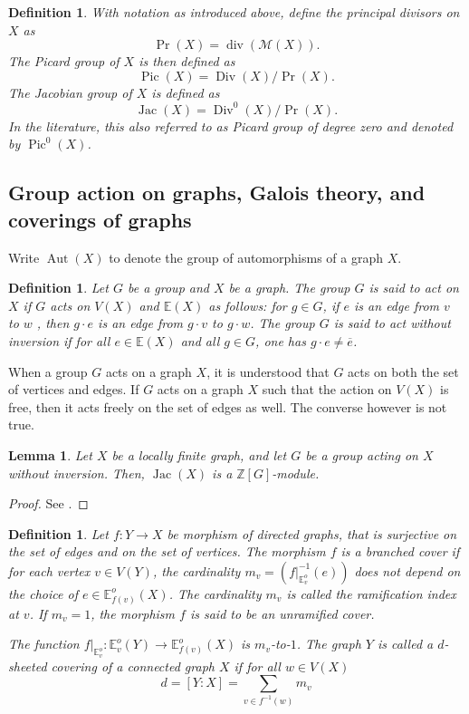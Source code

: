 \documentclass{amsart}
\newtheorem{lemma}[theorem]{Lemma}
\newtheorem{definition}[theorem]{Definition}
\numberwithin{equation}{section}
\theoremstyle{remark}
\newcommand{\Div}{\operatorname{Div}}
\newcommand{\Aut}{\operatorname{Aut}}
\newcommand{\Jac}{\operatorname{Jac}}
\newcommand{\Pic}{\operatorname{Pic}}
\newcommand{\Z}{\mathbb{Z}}
\newcommand{\E}{\mathbb{E}}
\theoremstyle{plain} %
\begin{document}
\begin{definition}
{With notation as introduced above, define the \emph{principal divisors on $X$} as
\[
\Pr(X) = \operatorname{div}(\mathcal{M}(X)).
\]}
The \emph{Picard group of $X$} is then defined as
\[
\Pic(X) = \Div(X)/\Pr(X).
\]
The \emph{Jacobian group of $X$} is defined as
\[
\Jac(X) = \Div^0(X)/\Pr(X).
\]
{In the literature, this also referred to as \emph{Picard group of degree zero} and denoted by $\Pic^0(X)$.}
\end{definition}


\subsection{Group action on graphs, Galois theory, and coverings of graphs}

Write $\Aut(X)$ to denote the group of automorphisms of a graph $X$. 
\begin{definition}
Let $G$ be a group and $X$ be a graph.
The group $G$ is said to \emph{act on $X$} if  {$G$ acts on $V(X)$ and $\E(X)$ as follows:
for $g\in G$, if $e$ is an edge from $v$ to $w$ , then $g\cdot e$ is an edge from $g\cdot v$ to $g\cdot w$.}
The group $G$ is said to \emph{act without inversion} if for all $e \in \E(X)$ and all $g \in G$, one has $g \cdot e\neq \overline{e}$.
\end{definition}

When a group $G$ acts on a graph $X$, it is understood that $G$ acts on both the set of vertices and edges.
If $G$ acts on a graph $X$ such that the action on $V(X)$ is free, then it acts freely on the set of edges as well.
{The converse however is not true.}

\begin{lemma}
Let $X$ be a locally finite graph, and let $G$ be a group acting on $X$ without inversion.
Then, $\Jac(X)$ is a $\Z[G]$-module.
\end{lemma}

\begin{proof}
See \cite[Corollary~2.6]{GV24}.    
\end{proof}


\begin{definition}
Let $f\colon Y\to X$ be morphism of directed graphs, that is surjective on the set of edges and on the set of vertices. 
The morphism $f$ is a \emph{branched cover} if for each vertex $v\in V(Y)$, the cardinality $m_v= (f\vert_{\E^o_v}^{-1}(e))$ does not depend on the choice of $e\in \E^o_{f(v)}(X)$.
The cardinality $m_v$ is called the \emph{ramification index} at $v$.
If $m_v=1$, the morphism $f$ is said to be an \emph{unramified cover}. 

\smallskip


The function $f\vert_{\E^o_v} \colon \E^o_v(Y) \to \E^o_{f(v)}(X)$ is $m_v$-to-$1$.
The graph $Y$ is called a \emph{$d$-sheeted covering} of a connected graph $X$ if for all $w\in V(X)$
\[
d = [Y:X] = \sum_{v \in f^{-1}(w)} m_{v}
\]
\end{definition}
\end{document}
